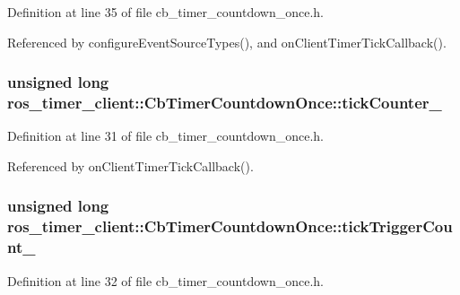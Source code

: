 Definition at line 35 of file cb\+\_\+timer\+\_\+countdown\+\_\+once.\+h.



Referenced by configure\+Event\+Source\+Types(), and on\+Client\+Timer\+Tick\+Callback().

\subsubsection[{\texorpdfstring{tick\+Counter\+\_\+}{tickCounter_}}]{\setlength{\rightskip}{0pt plus 5cm}unsigned long ros\+\_\+timer\+\_\+client\+::\+Cb\+Timer\+Countdown\+Once\+::tick\+Counter\+\_\+\hspace{0.3cm}{\ttfamily [private]}}\hypertarget{classros__timer__client_1_1CbTimerCountdownOnce_a54fbda19dd432efc2a06014bbc88528c}{}\label{classros__timer__client_1_1CbTimerCountdownOnce_a54fbda19dd432efc2a06014bbc88528c}


Definition at line 31 of file cb\+\_\+timer\+\_\+countdown\+\_\+once.\+h.



Referenced by on\+Client\+Timer\+Tick\+Callback().

\subsubsection[{\texorpdfstring{tick\+Trigger\+Count\+\_\+}{tickTriggerCount_}}]{\setlength{\rightskip}{0pt plus 5cm}unsigned long ros\+\_\+timer\+\_\+client\+::\+Cb\+Timer\+Countdown\+Once\+::tick\+Trigger\+Count\+\_\+\hspace{0.3cm}{\ttfamily [private]}}\hypertarget{classros__timer__client_1_1CbTimerCountdownOnce_a450455322b6158895c709f25a19d464d}{}\label{classros__timer__client_1_1CbTimerCountdownOnce_a450455322b6158895c709f25a19d464d}


Definition at line 32 of file cb\+\_\+timer\+\_\+countdown\+\_\+once.\+h.



